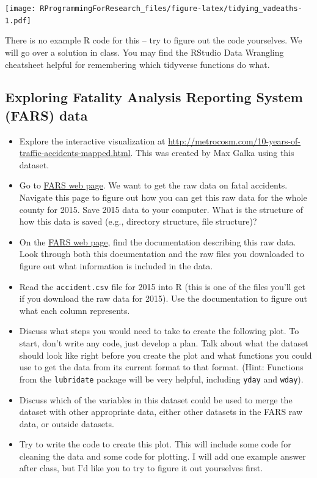\documentclass[]{book}
\providecommand{\tightlist}{%
  \setlength{\itemsep}{0pt}\setlength{\parskip}{0pt}}
\theoremstyle{definition}
\theoremstyle{definition}
\theoremstyle{definition}
\theoremstyle{remark}
\begin{document}
\texttt{[image: RProgrammingForResearch\_files/figure-latex/tidying\_vadeaths-1.pdf]}

There is no example R code for this -- try to figure out the code
yourselves. We will go over a solution in class. You may find the
RStudio Data Wrangling cheatsheet helpful for remembering which
tidyverse functions do what.

\subsection{Exploring Fatality Analysis Reporting System (FARS)
data}\label{exploring-fatality-analysis-reporting-system-fars-data}

\begin{itemize}
\tightlist
\item
  Explore the interactive visualization at
  \url{http://metrocosm.com/10-years-of-traffic-accidents-mapped.html}.
  This was created by Max Galka using this dataset.
\item
  Go to \href{http://www.nhtsa.gov/FARS}{FARS web page}. We want to get
  the raw data on fatal accidents. Navigate this page to figure out how
  you can get this raw data for the whole county for 2015. Save 2015
  data to your computer. What is the structure of how this data is saved
  (e.g., directory structure, file structure)?
\item
  On the \href{http://www.nhtsa.gov/FARS}{FARS web page}, find the
  documentation describing this raw data. Look through both this
  documentation and the raw files you downloaded to figure out what
  information is included in the data.
\item
  Read the \texttt{accident.csv} file for 2015 into R (this is one of
  the files you'll get if you download the raw data for 2015). Use the
  documentation to figure out what each column represents.
\item
  Discuss what steps you would need to take to create the following
  plot. To start, don't write any code, just develop a plan. Talk about
  what the dataset should look like right before you create the plot and
  what functions you could use to get the data from its current format
  to that format. (Hint: Functions from the \texttt{lubridate} package
  will be very helpful, including \texttt{yday} and \texttt{wday}).
\item
  Discuss which of the variables in this dataset could be used to merge
  the dataset with other appropriate data, either other datasets in the
  FARS raw data, or outside datasets.
\item
  Try to write the code to create this plot. This will include some code
  for cleaning the data and some code for plotting. I will add one
  example answer after class, but I'd like you to try to figure it out
  yourselves first.
\end{itemize}
\end{document}
